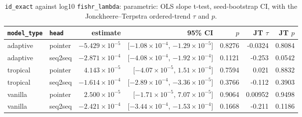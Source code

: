 \documentclass[10pt]{article}
\begin{document}
{\small
\begin{longtable}{llrrrrr}
\caption{\texttt{id\_exact} against log10 \texttt{fishr\_lambda}: parametric: OLS slope t-test, seed-bootstrap CI, with the Jonckheere--Terpstra ordered-trend $\tau$ and $p$.}\label{tab:trend-id_exact}\\
\toprule
\texttt{model\_type} & \texttt{head} & estimate & 95\% CI & $p$ & JT $\tau$ & JT $p$\\
\midrule
\endhead
adaptive & pointer & $-5.429\times10^{-5}$ & [$-1.08\times10^{-4}$, $-1.29\times10^{-5}$] & 0.8276 & -0.0324 & 0.8084\\
adaptive & seq2seq & $-2.871\times10^{-4}$ & [$-4.08\times10^{-4}$, $-1.92\times10^{-4}$] & 0.1121 & -0.253 & 0.0542\\
tropical & pointer & $4.143\times10^{-5}$ & [$-4.07\times10^{-5}$, $1.51\times10^{-4}$] & 0.7594 & 0.021 & 0.8832\\
tropical & seq2seq & $-1.614\times10^{-4}$ & [$-2.89\times10^{-4}$, $-3.36\times10^{-5}$] & 0.3766 & -0.112 & 0.3903\\
vanilla & pointer & $2.500\times10^{-5}$ & [$-1.71\times10^{-5}$, $7.07\times10^{-5}$] & 0.9064 & 0.00952 & 0.9498\\
vanilla & seq2seq & $-2.421\times10^{-4}$ & [$-3.44\times10^{-4}$, $-1.53\times10^{-4}$] & 0.1668 & -0.211 & 0.1186\\
\bottomrule
\end{longtable}
}
\end{document}
